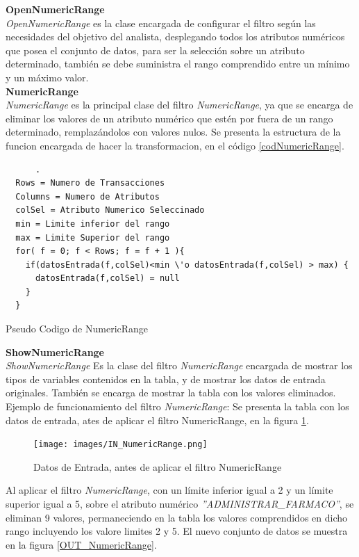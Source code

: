 \textbf{OpenNumericRange} \\ 
\textit{OpenNumericRange} es la clase encargada de configurar el filtro seg\'un las necesidades del objetivo del analista, desplegando todos los atributos num\'ericos que posea el conjunto de datos, para ser la selecci\'on sobre un atributo determinado, tambi\'en se debe suministra el rango comprendido entre un m\'inimo y un m\'aximo valor. \\

\textbf{NumericRange} \\ 
\textit{NumericRange} es la principal clase del filtro \textit{NumericRange}, ya que se encarga de eliminar los valores de un atributo num\'erico que est\'en por fuera de un rango determinado, remplaz\'andolos con valores nulos.
Se presenta la estructura de la funcion encargada de hacer la transformacion, en el c\'odigo \ref{codNumericRange}. \\
      
\begin{codigof}[!h]
\begin{verbatim}      . 
  Rows = Numero de Transacciones
  Columns = Numero de Atributos
  colSel = Atributo Numerico Seleccinado 
  min = Limite inferior del rango 
  max = Limite Superior del rango
  for( f = 0; f < Rows; f = f + 1 ){ 
    if(datosEntrada(f,colSel)<min \'o datosEntrada(f,colSel) > max) { 
      datosEntrada(f,colSel) = null
    }
  }
\end{verbatim}
\caption{Pseudo Codigo de NumericRange}
\label{codNumericRange}
\end{codigof}
      
\textbf{ShowNumericRange} \\ 
\textit{ShowNumericRange}       
Es la clase del filtro \textit{NumericRange} encargada de mostrar los tipos de variables contenidos en la tabla, y de mostrar los datos de entrada originales. Tambi\'en se encarga de mostrar la tabla con los valores eliminados.
Ejemplo de funcionamiento del filtro \textit{NumericRange}:
Se presenta la tabla con los datos de entrada, ates de aplicar el filtro NumericRange, en la figura \ref{IN_NumericRange}. \\

\begin{figure}[h]
\centering
\texttt{[image: images/IN\_NumericRange.png]}
\caption{Datos de Entrada, antes de aplicar el filtro NumericRange}
\label{IN_NumericRange}
\end{figure}

Al aplicar el filtro \textit{NumericRange}, con un l\'imite inferior igual a 2 y un l\'imite superior igual a 5, sobre el atributo num\'erico \textit{''ADMINISTRAR\_FARMACO''}, se eliminan 9 valores, permaneciendo en la tabla los valores comprendidos en dicho rango incluyendo los valore limites 2 y 5. El nuevo conjunto de datos se muestra en la figura \ref{OUT_NumericRange}. \\


